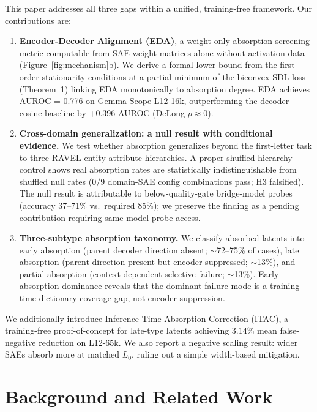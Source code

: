 \documentclass{article}
\begin{document}
This paper addresses all three gaps within a unified, training-free framework. Our contributions are:

\begin{enumerate}
\item \textbf{Encoder-Decoder Alignment (EDA)}, a weight-only absorption screening metric computable from SAE weight matrices alone without activation data (Figure~\ref{fig:mechanism}b). We derive a formal lower bound from the first-order stationarity conditions at a partial minimum of the biconvex SDL loss (Theorem~1) linking EDA monotonically to absorption degree. EDA achieves AUROC = 0.776 on Gemma Scope L12-16k, outperforming the decoder cosine baseline by +0.396 AUROC (DeLong $p \approx 0$).

\item \textbf{Cross-domain generalization: a null result with conditional evidence.} We test whether absorption generalizes beyond the first-letter task to three RAVEL entity-attribute hierarchies. A proper shuffled hierarchy control shows real absorption rates are statistically indistinguishable from shuffled null rates (0/9 domain-SAE config combinations pass; H3 falsified). The null result is attributable to below-quality-gate bridge-model probes (accuracy 37--71\% vs.\ required 85\%); we preserve the finding as a pending contribution requiring same-model probe access.

\item \textbf{Three-subtype absorption taxonomy.} We classify absorbed latents into early absorption (parent decoder direction absent; $\sim$72--75\% of cases), late absorption (parent direction present but encoder suppressed; $\sim$13\%), and partial absorption (context-dependent selective failure; $\sim$13\%). Early-absorption dominance reveals that the dominant failure mode is a training-time dictionary coverage gap, not encoder suppression.
\end{enumerate}

We additionally introduce Inference-Time Absorption Correction (ITAC), a training-free proof-of-concept for late-type latents achieving 3.14\% mean false-negative reduction on L12-65k. We also report a negative scaling result: wider SAEs absorb more at matched $L_0$, ruling out a simple width-based mitigation.

\section{Background and Related Work}
\end{document}
